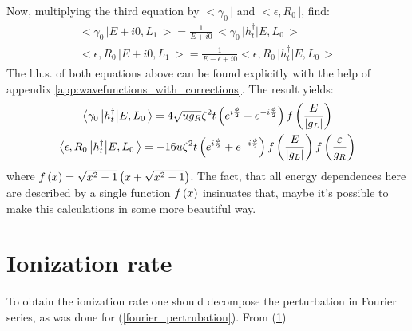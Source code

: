 Now, multiplying the third equation by $ \big<\gamma_{0}\,\big| $ and $ \big<\epsilon,R_{0}\,\big |$, find:
\begin{gather}
	\big<\gamma_{0}\,\big|E+i0,L_{1}\,\big>=\frac{1}{E+i0}\,\big<\gamma_{0}\,\big|h_{t}^{\dagger}\big|E,L_{0}\,\big>\\\big<\epsilon,R_{0}\,\big|E+i0,L_{1}\,\big>=\frac{1}{E-\epsilon+i0}\big<\epsilon,R_{0}\,\big|h_{t}^{\dagger}\big|E,L_{0}\,\big>
\end{gather}
The l.h.s. of both equations above can be found explicitly with the help of appendix \ref{app:wavefunctions_with_corrections}. The result yields:
\begin{gather}
\label{tunnel_matrix_elements_maj-cont}
	\big<\gamma_{0}\,\big|h_{t}^{\dagger}\big|E,L_{0}\,\big>
	=
	4\sqrt{ug_{R}}
	\zeta^{2}t
	\left(e^{i\frac{\phi}{2}}+e^{-i\frac{\phi}{2}}\right)
	f\left(\frac{E}{\left|g_L\right|}\right)
	\\
	\label{tunnel_matrix_elements_cont-cont}
	\big<\epsilon,R_{0}\,\big|h_{t}^{\dagger}\big|E,L_{0}\,\big>
	=
	-16u\zeta^{2}t
	\left(e^{i\frac{\phi}{2}}+e^{-i\frac{\phi}{2}}\right)
	f\left(\frac{E}{\left|g_L\right|}\right)
	f\left(\frac{\varepsilon}{g_R}\right)
\end{gather}
where $ f\left(x\right)=\sqrt{x^2-1}\left(x+\sqrt{x^2-1}\right) $. The fact, that all energy dependences here are described by a single function $ f\left(x\right) $ insinuates that, maybe it's possible to make this calculations in some more beautiful way.

\section{Ionization rate}
To obtain the ionization rate one should decompose the perturbation in Fourier series, as was done for (\ref{fourier_pertrubation}). From (\ref{})